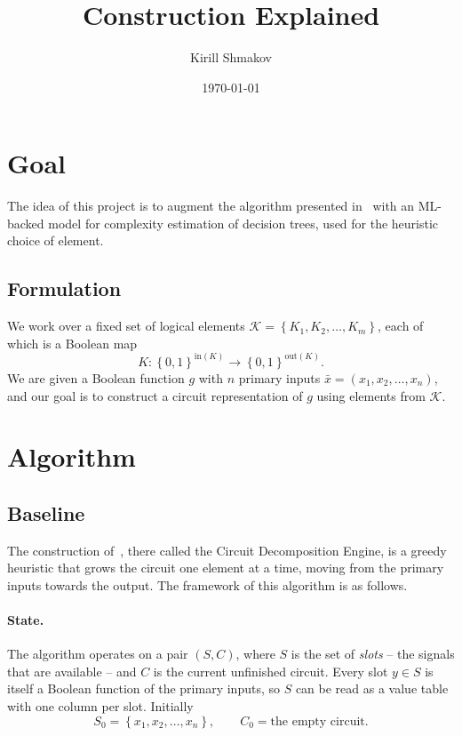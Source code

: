 \documentclass[11pt]{article}
\title{Construction Explained}
\author{Kirill Shmakov}
\date{\today}
\begin{document}
\nocite{*}

\maketitle


\section{Goal}

The idea of this project is to augment the algorithm presented
in~\cite{rokach2013mlcircuit} with an ML-backed model for complexity estimation
of decision trees, used for the heuristic choice of element.

\subsection{Formulation}

We work over a fixed set of logical elements
$\mathcal{K} = \left\{ K_1, K_2, \dots, K_m \right\}$, each of which is a Boolean map
$$
    K : \left\{0, 1\right\}^{\mathrm{in}(K)} \to \left\{0, 1\right\}^{\mathrm{out}(K)}.
$$
We are given a Boolean function $g$ with $n$ primary inputs $\bar{x} = \left(x_1, x_2, \dots, x_n\right)$,
and our goal is to construct a circuit representation of $g$ using elements from $\mathcal{K}$.


\section{Algorithm}

\subsection{Baseline}

The construction of~\cite{rokach2013mlcircuit}, there called the Circuit Decomposition
Engine, is a greedy heuristic that grows the circuit one element at a time, moving from
the primary inputs towards the output. The framework of this algorithm is as follows.

\paragraph{State.} The algorithm operates on a pair $(S, C)$, where $S$ is the set of
\emph{slots} -- the signals that are available -- and $C$ is the current unfinished
circuit. Every slot $y \in S$ is itself a Boolean function of the primary inputs,
so $S$ can be read as a value table with one column per slot. Initially
$$
    S_0 = \left\{x_1, x_2, \dots, x_n\right\}, \qquad C_0 = \text{the empty circuit}.
$$
\end{document}
